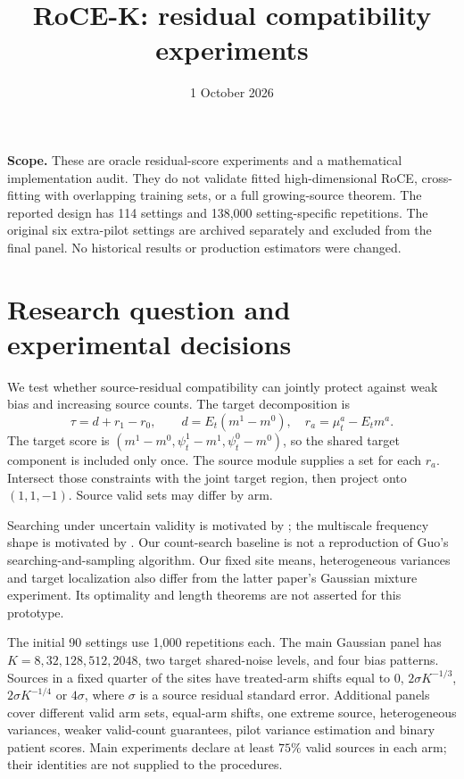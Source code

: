 \documentclass[11pt]{article}
\title{RoCE-K: residual compatibility experiments}
\author{}
\date{1 October 2026}
\begin{document}
\maketitle
\textbf{Scope.} These are oracle residual-score experiments and a mathematical
implementation audit. They do not validate fitted high-dimensional RoCE,
cross-fitting with overlapping training sets, or a full growing-source theorem.
The reported design has 114 settings and 138,000 setting-specific repetitions.
The original six extra-pilot settings are archived separately and excluded from
the final panel. No historical results or production estimators were changed.

\section{Research question and experimental decisions}

We test whether source-residual compatibility can jointly protect against weak
bias and increasing source counts. The target decomposition is
\[
 \tau=d+r_1-r_0,\qquad
 d=E_t(m^1-m^0),\quad r_a=\mu_t^a-E_tm^a.
\]
The target score is $(m^1-m^0,\psi_t^1-m^1,\psi_t^0-m^0)$, so the shared
target component is included only once. The source module supplies a set for
each $r_a$. Intersect those constraints with the joint target region, then
project onto $(1,1,-1)$. Source valid sets may differ by arm.

Searching under uncertain validity is motivated by \citet{guo2023}; the
multiscale frequency shape is motivated by \citet{wang2026}. Our count-search
baseline is not a reproduction of Guo's searching-and-sampling algorithm.
Our fixed site means, heterogeneous variances and target localization also
differ from the latter paper's Gaussian mixture experiment. Its optimality
and length theorems are not asserted for this prototype.

The initial 90 settings use 1,000 repetitions each. The main Gaussian panel
has $K=8,32,128,512,2048$, two target shared-noise levels, and four bias
patterns. Sources in a fixed quarter of the sites have treated-arm shifts
equal to $0$, $2\sigma K^{-1/3}$, $2\sigma K^{-1/4}$ or $4\sigma$, where
$\sigma$ is a source residual standard error. Additional panels cover
different valid arm sets, equal-arm shifts, one extreme source, heterogeneous
variances, weaker valid-count guarantees, pilot variance estimation and binary
patient scores. Main experiments declare at least $75\%$ valid sources in
each arm; their identities are not supplied to the procedures.
\end{document}
